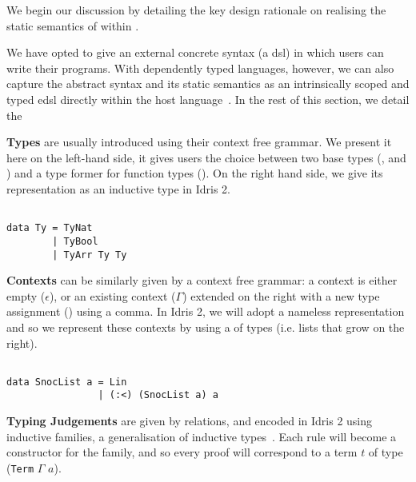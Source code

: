 
We begin our discussion by detailing the key design rationale on
realising the static semantics of \Velo{} within \Idris{}.

We have opted to give \Velo{} an external concrete syntax (a \ac{dsl})
in which users can write their programs.
%
With dependently typed languages, however, we can also capture
the abstract syntax and its static semantics as an intrinsically
scoped and typed \ac{edsl}
directly within the host language~\cite{Augustsson1999edt}.
%
In the rest of this section, we detail the


\textbf{Types} are usually introduced using their context free grammar.
%
We present it here on the left-hand side, it gives users the choice between
two base types (\TyNat, and \TyBool) and a type former for function types
(\TyFunc{\cdot}{\cdot}).
%
On the right hand side, we give its representation as an inductive
type in Idris 2.

\begin{minipage}{0.45\textwidth}
\syntaxtypes
\end{minipage}\hfill
\begin{minipage}{0.45\textwidth}
\begin{Verbatim}

data Ty = TyNat
        | TyBool
        | TyArr Ty Ty
\end{Verbatim}
\end{minipage}

\textbf{Contexts} can be similarly given by a context free grammar:
a context is either empty ($\epsilon$), or an existing context ($\Gamma$)
extended on the right with a new type assignment () using a comma.
%
In Idris 2, we will adopt a nameless representation and so we represent
these contexts by using a  of types
(i.e. lists that grow on the right).

\begin{minipage}{0.35\textwidth}
\syntaxcontexts
\end{minipage}\hfill
\begin{minipage}{0.55\textwidth}
\begin{Verbatim}

data SnocList a = Lin
                | (:<) (SnocList a) a
\end{Verbatim}
\end{minipage}


\textbf{Typing Judgements} are given by relations, and encoded in
Idris 2 using inductive families, a generalisation of inductive
types~\cite{DBLP:journals/fac/Dybjer94}.
%
Each rule will become a constructor for the family, and so every
proof \inferenceRule{} will correspond to a term $t$ of type
(\texttt{Term} $\Gamma$ $a$).

